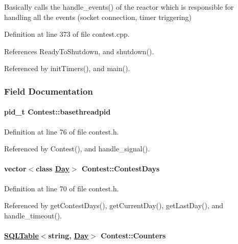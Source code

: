 Basically calls the handle\_\-events() of the reactor which is responsible for handling all the events (socket connection, timer triggering) 

Definition at line 373 of file contest.cpp.

References Ready\-To\-Shutdown, and shutdown().

Referenced by init\-Timers(), and main().

\subsubsection{Field Documentation}
\hypertarget{classContest_Contesto6}{
\paragraph[basethreadpid]{\setlength{\rightskip}{0pt plus 5cm}pid\_\-t Contest::basethreadpid}\hfill}
\label{classContest_Contesto6}




Definition at line 76 of file contest.h.

Referenced by Contest(), and handle\_\-signal().\hypertarget{classContest_Contesto4}{
\paragraph[ContestDays]{\setlength{\rightskip}{0pt plus 5cm}vector$<$class \hyperlink{classDay}{Day}$>$ Contest::Contest\-Days}\hfill}
\label{classContest_Contesto4}




Definition at line 70 of file contest.h.

Referenced by get\-Contest\-Days(), get\-Current\-Day(), get\-Last\-Day(), and handle\_\-timeout().\hypertarget{classContest_Contestm13}{
\paragraph[Counters]{\setlength{\rightskip}{0pt plus 5cm}\hyperlink{classSQLTable}{SQLTable}$<$string, \hyperlink{classDay}{Day}$>$ Contest::Counters}\hfill}
\label{classContest_Contestm13}




